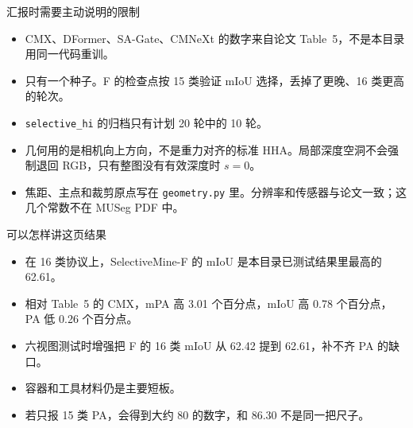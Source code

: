 \documentclass[aspectratio=169,11pt]{ctexbeamer}
\begin{document}
\begin{frame}{汇报时需要主动说明的限制}
  \begin{itemize}
    \item CMX、DFormer、SA-Gate、CMNeXt 的数字来自论文 Table~5，不是本目录用同一代码重训。
    \item 只有一个种子。F 的检查点按 15 类验证 mIoU 选择，丢掉了更晚、16 类更高的轮次。
    \item \texttt{selective\_hi} 的归档只有计划 20 轮中的 10 轮。
    \item 几何用的是相机向上方向，不是重力对齐的标准 HHA。局部深度空洞不会强制退回 RGB，只有整图没有有效深度时 $s=0$。
    \item 焦距、主点和裁剪原点写在 \texttt{geometry.py} 里。分辨率和传感器与论文一致；这几个常数不在 MUSeg PDF 中。
  \end{itemize}
\end{frame}

\begin{frame}{可以怎样讲这页结果}
  \begin{itemize}
    \item 在 16 类协议上，SelectiveMine-F 的 mIoU 是本目录已测试结果里最高的 62.61。
    \item 相对 Table~5 的 CMX，mPA 高 3.01 个百分点，mIoU 高 0.78 个百分点，PA 低 0.26 个百分点。
    \item 六视图测试时增强把 F 的 16 类 mIoU 从 62.42 提到 62.61，补不齐 PA 的缺口。
    \item 容器和工具材料仍是主要短板。
    \item 若只报 15 类 PA，会得到大约 80 的数字，和 86.30 不是同一把尺子。
  \end{itemize}
\end{frame}
\end{document}
